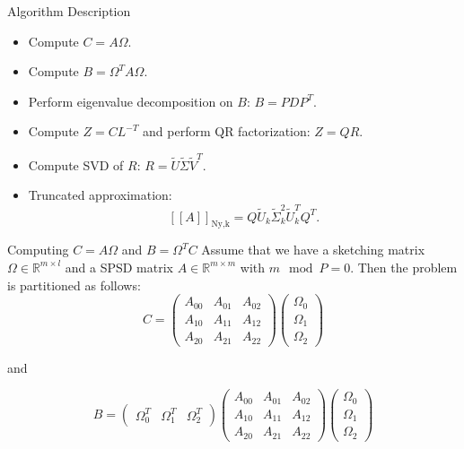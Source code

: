 \documentclass[aspectratio=169, xcolor=table]{beamer}
\begin{document}
\begin{frame}{Algorithm Description}
  \begin{itemize}
    \item Compute $C = A \Omega$.
    \item Compute $B = \Omega^T A \Omega$.
    \item Perform eigenvalue decomposition on $B$: $B = P D P^T$.
    \item Compute $Z = CL^{-T}$ and perform QR factorization: $Z = QR$.
    \item Compute SVD of $R$: $R = \tilde{U}\tilde{\Sigma}\tilde{V}^T$.
    \item Truncated approximation:
    \[
      [\![A]\!]_{\text{Ny,k}} = Q \tilde{U}_k \tilde{\Sigma}_k^2 \tilde{U}_k^T Q^T.
      \]
    \end{itemize}
  \end{frame}
  \begin{frame}{Computing $C = A\Omega$ and $B =\Omega^TC$}
    Assume that we have a sketching matrix $\Omega \in \mathbb{R}^{m \times l}$ and a SPSD matrix $A \in \mathbb{R}^{m \times m}$ with $m \mod P = 0$. Then the problem is partitioned as follows:
    \[
        C = 
        \begin{pmatrix}
        A_{00} & A_{01} & A_{02} \\
        A_{10} & A_{11} & A_{12}\\
        A_{20} & A_{21} & A_{22}
        \end{pmatrix}
        \begin{pmatrix}
        \Omega_{0} \\
        \Omega_{1} \\
        \Omega_{2}
        \end{pmatrix}
    \]
  
    and
  
    \[
            B = 
            \begin{pmatrix}
        \Omega_{0}^T & \Omega_{1}^T &\Omega_{2}^T
        \end{pmatrix}
        \begin{pmatrix}
        A_{00} & A_{01} & A_{02} \\
        A_{10} & A_{11} & A_{12}\\
        A_{20} & A_{21} & A_{22}
        \end{pmatrix}
        \begin{pmatrix}
        \Omega_{0} \\
        \Omega_{1} \\
        \Omega_{2}
        \end{pmatrix}
    \]
  \end{frame}
\end{document}
